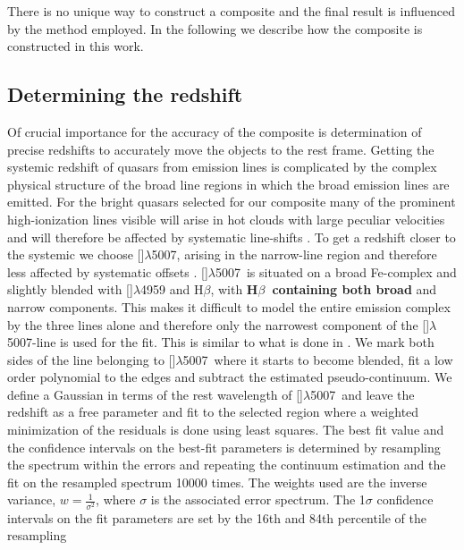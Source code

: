 \documentclass{aa}    %
\newcommand{\sectlabel}[1]{\label{sect:#1}}
\newcommand{\hb}{H$\beta$}
\newcommand{\oiii}{[\ion{O}{iii}]$\lambda$5007}
\begin{document}
There is no unique way to construct a composite and the final result is
influenced by the method employed. In the following we describe how the
composite is constructed in this work.

\subsection{Determining the redshift}  \sectlabel{redshifts}

Of crucial importance for the accuracy of the composite is
determination of precise redshifts to accurately move the objects to
the rest frame. Getting the systemic redshift of quasars from emission
lines is complicated by the complex physical structure of the broad
line regions in which the broad emission lines are emitted. For the
bright quasars selected for our composite many of the prominent
high-ionization lines visible will arise in hot clouds with large
peculiar velocities and will therefore be affected by systematic
line-shifts \citep{Tytler1992, Richards2002b, Gaskell2013}. To get a
redshift closer to the systemic we choose \oiii, arising in the
narrow-line region and therefore less affected by systematic offsets
\citep{Hewett2010}. \oiii~is situated on a broad Fe-complex and
slightly blended with []$\lambda$4959 and \hb, with \textbf{\hb~containing both broad} and narrow components.  
This makes it difficult to
model the entire emission complex by the three lines alone and
therefore only the narrowest component of the \oiii-line is used for
the fit. This is similar to what is done in \citet{VandenBerk2001}.
We mark both sides of the line belonging to
\oiii~where it starts to become blended, fit a low order polynomial
to the edges and subtract the estimated pseudo-continuum.
We define a Gaussian in terms of the rest wavelength of \oiii~and
leave the redshift as a free parameter and fit to the selected
region where a weighted minimization of the residuals is done using
least squares. The best fit value and the confidence intervals on the
best-fit parameters is determined by resampling the spectrum within
the errors and repeating the continuum estimation and the fit on the
resampled spectrum 10000 times. The weights used are the inverse
variance, $ w = \frac{1}{\sigma^2}$, where $\sigma$ is the associated
error spectrum. The 1$\sigma$ confidence intervals on the fit
parameters are set by the 16th and 84th percentile of the resampling
\end{document}
